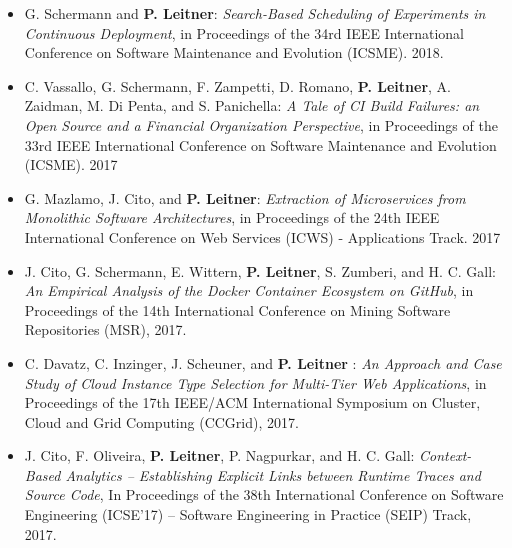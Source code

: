 \documentclass[paper=letter,fontsize=11pt]{scrartcl} %
\begin{document}
\begin{itemize}
	\item G. Schermann and \textbf{P. Leitner}: \emph{Search-Based Scheduling of Experiments in Continuous Deployment}, in Proceedings of the 34rd IEEE International Conference on Software Maintenance and Evolution (ICSME). 2018.
	\item C. Vassallo, G. Schermann, F. Zampetti, D. Romano, \textbf{P. Leitner}, A. Zaidman, M. Di Penta, and S. Panichella: \emph{A Tale of CI Build Failures: an Open Source and a Financial Organization Perspective}, in Proceedings of the 33rd IEEE International Conference on Software Maintenance and Evolution (ICSME). 2017
	\item G. Mazlamo, J. Cito, and \textbf{P. Leitner}: \emph{Extraction of Microservices from Monolithic Software Architectures}, in Proceedings of the 24th IEEE International Conference on Web Services (ICWS) - Applications Track. 2017
	\item J. Cito, G. Schermann, E. Wittern, \textbf{P. Leitner}, S. Zumberi, and H. C. Gall: \emph{An Empirical Analysis of the Docker Container Ecosystem on GitHub}, in Proceedings of the 14th International Conference on Mining Software Repositories (MSR), 2017.
	\item C. Davatz, C. Inzinger, J. Scheuner, and \textbf{P. Leitner} : \emph{An Approach and Case Study of Cloud Instance Type Selection for Multi-Tier Web Applications}, in Proceedings of the 17th IEEE/ACM International Symposium on Cluster, Cloud and Grid Computing (CCGrid), 2017.
	\item J. Cito, F. Oliveira, \textbf{P. Leitner}, P. Nagpurkar, and H. C. Gall: \emph{Context-Based Analytics – Establishing Explicit Links between Runtime Traces and Source Code}, In Proceedings of the 38th International Conference on Software Engineering (ICSE'17) -- Software Engineering in Practice (SEIP) Track, 2017.

\end{itemize}
\end{document}
